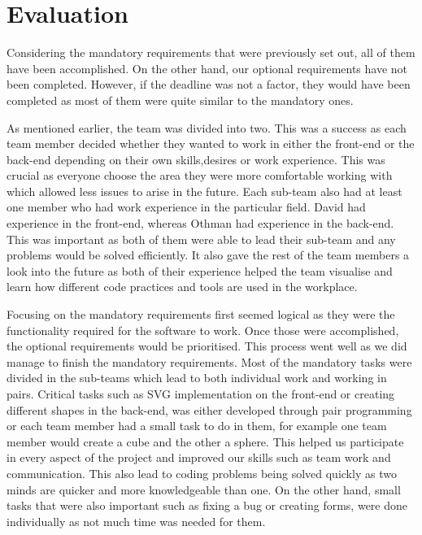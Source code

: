 \documentclass{article}
\begin{document}
	
	\section{Evaluation}
	Considering the mandatory requirements that were previously set out, all of them have been accomplished. %
	On the other hand, our optional requirements have not been completed. However, if the deadline was not a factor, they would have been completed as most of them were quite similar to the mandatory ones. 
	
	As mentioned earlier, the team was divided into two. This was a success as each team member decided whether they wanted to work in either the front-end or the back-end depending on their own skills,desires or work experience. This was crucial as everyone choose the area they were more comfortable working with which allowed less issues to arise in the future. Each sub-team also had at least one member who had work experience in the particular field. David had experience in the front-end, whereas Othman had experience in the back-end. This was important as both of them were able to lead their sub-team and any problems would be solved efficiently. It also gave the rest of the team members a look into the future as both of their experience helped the team visualise and learn how different code practices and tools are used in the workplace.
	
	Focusing on the mandatory requirements first seemed logical as they were the functionality required for the software to work. Once those were accomplished, the optional requirements would be prioritised. This process went well as we did manage to finish the mandatory requirements. Most of the mandatory tasks were divided in the sub-teams which lead to both individual work and working in pairs. Critical tasks such as SVG implementation on the front-end or creating different shapes in the back-end, was either developed through pair programming or each team member had a small task to do in them, for example one team member would create a cube and the other a sphere. This helped us participate in every aspect of the project and improved our skills such as  team work and communication. This also lead to  coding problems being solved quickly as two minds are quicker and more knowledgeable than one. On the other hand, small tasks that were also important such as fixing a bug or creating forms, were done individually as not much time was needed for them. 
	
\end{document}
